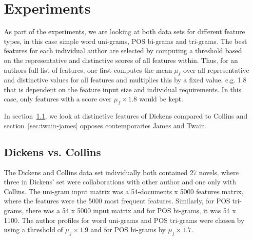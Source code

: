 \documentclass[a4paper,10pt,twoside,fleqn]{article}
\begin{document}
\section{Experiments}\label{sec:experiments}
As part of the experiments, we are looking at both data sets
for different feature types, in this case simple word uni-grams,
POS bi-grams and tri-grams. 
The best features for each individual author are selected by 
computing a threshold based on the representative and distinctive
scores of all features within. 
Thus, for an authors full list of features, one first computes 
the mean $\mu_f$ over all representative and distinctive values 
for all features and multiplies this by a fixed value, e.g. 1.8
that is dependent on the feature input size and individual
requirements. In this case, only features with a score over
$\mu_f \times 1.8$ would be kept. 

In section~\ref{sec:dickens-collins}, we look at distinctive
features of Dickens compared to Collins and section~\ref{sec:twain-james}
opposes contemporaries James and Twain. 

\subsection{Dickens vs. Collins} \label{sec:dickens-collins}
The Dickens and Collins data set individually both contained 27 novels,
where three in Dickens' set were collaborations with other author and 
one only with Collins. The uni-gram input matrix was a 
54-documents x 5000 features matrix, where the features were 
the 5000 most frequent features. 
Similarly, for POS tri-grams, there was a 54 x 5000 input matrix and
for POS bi-grams, it was 54 x 1100. 
The author profiles for word uni-grams and POS tri-grams were chosen
by using a threshold of $\mu_f \times 1.9$ and for
POS bi-grams by $\mu_f \times 1.7$. 
\end{document}
